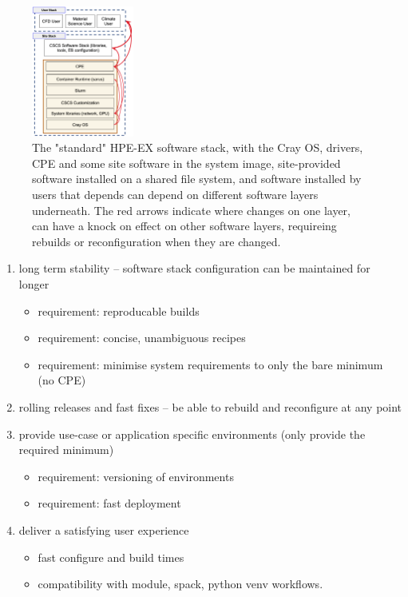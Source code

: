 \begin{figure}[htp!]
    \begin{center}
        \includegraphics[width=0.3\textwidth]{./images/stack-old.png}
    \end{center}
    \caption{
        The "standard" HPE-EX software stack, with the Cray OS, drivers, CPE and some site software in the system image, site-provided software installed on a shared file system, and software installed by users that depends can depend on different software layers underneath.
        The red arrows indicate where changes on one layer, can have a knock on effect on other software layers, requireing rebuilds or reconfiguration when they are changed.
    }
    \label{fig:stack-old}
\end{figure}


\begin{enumerate}
    \item long term stability -- software stack configuration can be maintained for longer
    \begin{itemize}
        \item requirement: reproducable builds
        \item requirement: concise, unambiguous recipes
        \item requirement: minimise system requirements to only the bare minimum (no CPE)
    \end{itemize}
    \item rolling releases and fast fixes -- be able to rebuild and reconfigure at any point
    \item provide use-case or application specific environments (only provide the required minimum)
    \begin{itemize}
        \item requirement: versioning of environments
        \item requirement: fast deployment
    \end{itemize}
    \item deliver a satisfying user experience
    \begin{itemize}
        \item fast configure and build times
        \item compatibility with module, spack, python venv workflows.
    \end{itemize}
\end{enumerate}


